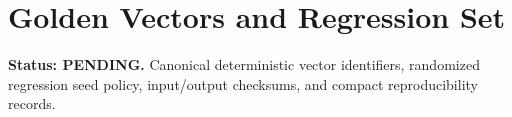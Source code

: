 \chapter{Golden Vectors and Regression Set}
\textbf{Status: PENDING.} Canonical deterministic vector identifiers, randomized regression
seed policy, input/output checksums, and compact reproducibility records.
